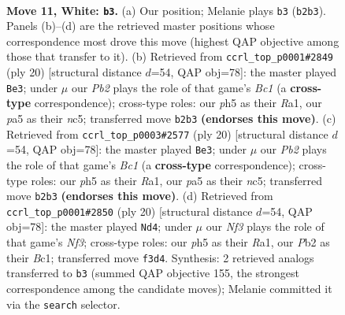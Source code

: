 \documentclass[11pt]{article}
\begin{document}
\clearpage

\begin{figure}[p]\centering
\begin{subfigure}{0.46\textwidth}\centering
\resizebox{\linewidth}{!}{%
\newchessgame
\chessboard[
  setfen={rnbq1rk1/1p2p1b1/5np1/p1p2p1p/2P5/2N2NP1/PP2PPBP/R1BQ1RK1 w - - 0 11},
  showmover=false,
  pgfstyle=straightmove, color=movearrow, markmove={b2-b3}
]}
\caption{}
\end{subfigure}\hfill
\begin{subfigure}{0.46\textwidth}\centering
\resizebox{\linewidth}{!}{%
\newchessgame
\chessboard[
  setfen={r1bq1rk1/pp2ppbp/5np1/2n5/8/2N2NP1/PP2PPBP/R1BQ1RK1 w - - 0 11},
  showmover=false,
  pgfstyle=straightmove, color=movearrow, markmove={c1-e3}
]}
\caption{}
\end{subfigure}
\\[4pt]
\begin{subfigure}{0.46\textwidth}\centering
\resizebox{\linewidth}{!}{%
\newchessgame
\chessboard[
  setfen={r1bq1rk1/pp2ppbp/5np1/2n5/8/2N2NP1/PP2PPBP/R1BQ1RK1 w - - 0 11},
  showmover=false,
  pgfstyle=straightmove, color=movearrow, markmove={c1-e3}
]}
\caption{}
\end{subfigure}\hfill
\begin{subfigure}{0.46\textwidth}\centering
\resizebox{\linewidth}{!}{%
\newchessgame
\chessboard[
  setfen={r1bq1rk1/pp2ppbp/5np1/2n5/8/2N2NP1/PP2PPBP/R1BQ1RK1 w - - 0 11},
  showmover=false,
  pgfstyle=straightmove, color=movearrow, markmove={f3-d4}
]}
\caption{}
\end{subfigure}
\caption{\textbf{Move 11, White: \texttt{b3}.} (a) Our position; Melanie plays \texttt{b3} (\texttt{b2b3}). Panels (b)--(d) are the retrieved master positions whose correspondence most drove this move (highest QAP objective among those that transfer to it). (b) Retrieved from \texttt{ccrl\_top\_p0001\#2849} (ply 20) [structural distance $d$=54, QAP obj=78]: the master played \texttt{Be3}; under $\mu$ our \emph{Pb2} plays the role of that game's \emph{Bc1} (a \textbf{cross-type} correspondence); cross-type roles: our \emph{p}h5 as their \emph{R}a1, our \emph{p}a5 as their \emph{n}c5; transferred move \texttt{b2b3} \textbf{(endorses this move)}. (c) Retrieved from \texttt{ccrl\_top\_p0003\#2577} (ply 20) [structural distance $d$=54, QAP obj=78]: the master played \texttt{Be3}; under $\mu$ our \emph{Pb2} plays the role of that game's \emph{Bc1} (a \textbf{cross-type} correspondence); cross-type roles: our \emph{p}h5 as their \emph{R}a1, our \emph{p}a5 as their \emph{n}c5; transferred move \texttt{b2b3} \textbf{(endorses this move)}. (d) Retrieved from \texttt{ccrl\_top\_p0001\#2850} (ply 20) [structural distance $d$=54, QAP obj=78]: the master played \texttt{Nd4}; under $\mu$ our \emph{Nf3} plays the role of that game's \emph{Nf3}; cross-type roles: our \emph{p}h5 as their \emph{R}a1, our \emph{P}b2 as their \emph{B}c1; transferred move \texttt{f3d4}. Synthesis: 2 retrieved analogs transferred to \texttt{b3} (summed QAP objective 155, the strongest correspondence among the candidate moves); Melanie committed it via the \texttt{search} selector.}
\label{fig:thought-m20}
\end{figure}
\end{document}
